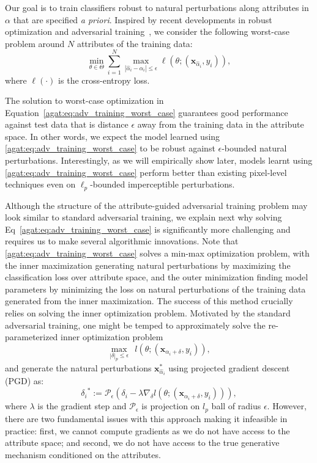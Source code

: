 Our goal is to train classifiers robust to natural perturbations along 
attributes in $\alpha$ that are specified \emph{a priori}. Inspired by recent developments in robust optimization and adversarial training~\citep{madry2018towards}, we consider the following worst-case problem around $N$ attributes of the training data:
\begin{equation}
    \min_{\theta\in \Theta}\sum_{i=1}^N\max_{|\hat{\alpha}_i-\alpha_i|\leq \epsilon} \ell(\theta;(\mathbf{x}_{\hat{\alpha}_i},y_i)),
    \label{agat:eq:adv_training_worst_case}
\end{equation}
where $\ell(\cdot)$ is the cross-entropy loss.

The solution to worst-case optimization in Equation~\ref{agat:eq:adv_training_worst_case} guarantees good performance against test data that is distance $\epsilon$ away from the training data in the attribute space. 
In other words, we expect the model learned using \eqref{agat:eq:adv_training_worst_case} to be robust against $\epsilon$-bounded natural perturbations.
Interestingly, as we will empirically show later, models learnt using \eqref{agat:eq:adv_training_worst_case} perform better than existing pixel-level techniques even on $\ell_p$-bounded imperceptible perturbations.

Although the structure of the attribute-guided adversarial training problem may look similar to standard adversarial training, we explain next why solving Eq~\eqref{agat:eq:adv_training_worst_case} is significantly more challenging and requires us to make several algorithmic innovations. 
Note that \eqref{agat:eq:adv_training_worst_case} solves a min-max optimization problem, with the inner maximization generating natural perturbations by maximizing the classification loss over attribute space, and the outer minimization finding model parameters by minimizing the loss on natural perturbations of the training data generated from the inner maximization. The success of this method crucially relies on solving the inner optimization problem. 
Motivated by the standard adversarial training, one might be temped to approximately solve the re-parameterized inner optimization problem
\begin{equation}
    \underset{|{\delta}|_p\leq \epsilon}{\max}~~l(\theta;(\mathbf{x}_{{\alpha}_i+{\delta}},y_i)),
\end{equation}
and generate the natural perturbations
$\mathbf{x}_{\hat{\alpha}_i}^*$
using projected gradient descent (PGD) as:
\begin{equation}
    {\delta_i}^* := \mathcal{P}_{\epsilon} (\delta_i-\lambda \nabla_{\delta} l(\theta;(\mathbf{x}_{{\alpha}_i+{\delta}},y_i))),
\end{equation}
where $\lambda$ is the gradient step and $\mathcal{P}_{\epsilon}$ is projection on $l_p$ ball of radius $\epsilon$. However, there are two fundamental issues with this approach making it infeasible in practice: first, we cannot compute gradients as we do not have access to the attribute space;
and second, we do not have access to the true generative mechanism conditioned on the attributes.

